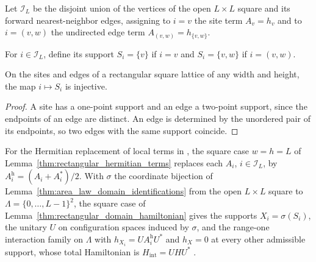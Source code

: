 \begin{definition}
    \label{def:square_interaction_labels}
    \leanok
    Let $\mathcal I_L$ be the disjoint union of the vertices of the open
    $L\times L$ square and its forward nearest-neighbor edges, assigning to
    $i=v$ the site term $A_v=h_v$ and to $i=(v,w)$ the undirected edge term
    $A_{(v,w)}=h_{\{v,w\}}$.
\end{definition}

\begin{definition}
    \label{def:square_interaction_support}
    \leanok
    For $i\in\mathcal I_L$, define its support $S_i=\{v\}$ if $i=v$ and
    $S_i=\{v,w\}$ if $i=(v,w)$.
\end{definition}

\begin{lemma}
    \label{thm:square_interaction_support_injective}
    \leanok
    On the sites and edges of a rectangular square lattice of any width and
    height, the map $i\mapsto S_i$ is injective.
\end{lemma}
\begin{proof}\leanok
    A site has a one-point support and an edge a two-point support, since the
    endpoints of an edge are distinct. An edge is determined by the unordered
    pair of its endpoints, so two edges with the same support coincide.
\end{proof}

For the Hermitian replacement of local terms in
\cite[Theorem~1.1]{OpenAI2026PolynomialPEPS}, the square case $w=h=L$ of
Lemma~\ref{thm:rectangular_hermitian_terms} replaces each $A_i$,
$i\in\mathcal I_L$, by $A_i^{\mathrm h}=(A_i+A_i^*)/2$. With $\sigma$ the
coordinate bijection of Lemma~\ref{thm:area_law_domain_identifications} from
the open $L\times L$ square to $\Lambda=\{0,\ldots,L-1\}^2$, the square case of
Lemma~\ref{thm:rectangular_domain_hamiltonian} gives the supports
$X_i=\sigma(S_i)$, the unitary $U$ on configuration spaces induced by
$\sigma$, and the range-one interaction family on $\Lambda$ with
$h_{X_i}=UA_i^{\mathrm h}U^*$ and $h_X=0$ at every other admissible support,
whose total Hamiltonian is $H_{\mathrm{int}}=UHU^*$
\cite{OpenAI2026PolynomialPEPS,OpenAI2026AreaLaw}.

